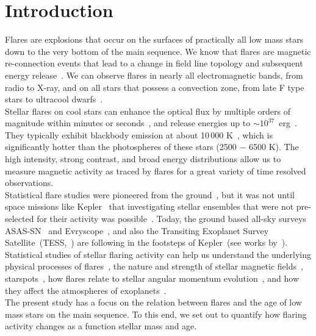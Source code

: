 \documentclass{aa}
\begin{document}
\section{Introduction}
Flares are explosions that occur on the surfaces of practically all low mass stars down to the very bottom of the main sequence. We know that flares are magnetic re-connection events that lead to a change in field line topology and subsequent energy release~\citep{priest_magnetic_2002}. We can observe flares in nearly all electromagnetic bands, from radio
to X-ray, and on all stars that possess a convection zone, from late F type stars to ultracool dwarfs~\citep{schaefer2000,benz2010,gizis2013}. 
\\
Stellar flares on cool stars can enhance the optical flux by multiple orders of magnitude within minutes or seconds~\citep{haisch1991, schmidt2019}, and release energies up to \mbox{$\sim10^{37}$ erg}~\citep{maehara2012, davenport_kepler_2016}. They typically exhibit blackbody emission at about 10\,000 K~\citep{hawley1992, kowalski2013}, which is significantly hotter than the photospheres of these stars (2500 $-$ 6500 K). The high intensity, strong contrast, and broad energy distributions allow us to measure magnetic activity as traced by flares for a great variety of time resolved observations.
\\
Statistical flare studies were pioneered from the ground~\citep{lacy_uv_1976}, but it was not until space missions like Kepler~\citep{koch2010} that investigating stellar ensembles that were not pre-selected for their activity was possible~\citep{walkowicz2011}. Today, the ground based all-sky surveys ASAS-SN~\citep{shappee2014} and Evryscope~\citep{law2015}, and also the Transiting Exoplanet Survey Satellite~(TESS,~\citealt{ricker2014}) are following in the footsteps of Kepler~(see works by~\citealt{schmidt2019,rodriguez2020,howard2019, howard2020, guenther2020, feinstein2020}). Statistical studies of stellar flaring activity can help us understand the underlying physical processes of flares~\citep{benz2010}, the nature and strength of stellar magnetic fields~\citep{berger2006, odert2017}, starspots~\citep{davenport_flaresandspots_2015, notsu2019, howard2020}, how flares relate to stellar angular momentum evolution~\citep{mondrik2019, howard2020}, and how they affect the atmospheres of exoplanets~\citep{lecavelier_flareescape_2012, loyd_mflaresplanetsfuv_2018, tilley_repeated_flare_2019, howard2019}.
\\
The present study has a focus on the relation between flares and the age of low mass stars on the main sequence. To this end, we set out to quantify how flaring activity changes as a function stellar mass and age. 
\end{document}
